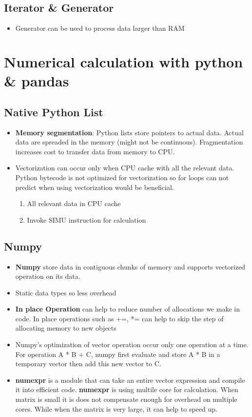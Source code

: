 \documentclass{article}
\begin{document}
	\subsection{Iterator \& Generator}
		\begin{itemize}
			\item Generator can be used to process data larger than RAM
		\end{itemize}


\section{Numerical calculation with python \& pandas}
	\subsection{Native Python List}
		\begin{itemize}
			\item {\bf Memory segmentation}: Python lists store pointers to actual data. Actual data are spreaded in the memory (might not be continuous). Fragmentation increases cost to transfer data from memory to CPU.
			\item Vectorization can occur only when CPU cache with all the relevant data. Python bytecode is not optimized for vectorization so for loops can not predict when using vectorization would be beneficial.
				\begin{enumerate}
					\item All relevant data in CPU cache
					\item Invoke SIMU instruction for calculation
				\end{enumerate}
		\end{itemize}
	\subsection{Numpy}
		\begin{itemize}
			\item {\bf Numpy} store data in contiguous chunks of memory and supports vectorized operation on its data.
			\item Static data types so less overhead
			\item {\bf In place Operation} can help to reduce  number of allocations we make in code. In place operations such as +=, *= can help to skip the step of allocating memory to new objects
			\item Numpy's optimization of vector operation occur only one operation at a time. For operation A * B + C, numpy first evaluate and store A * B in a temporary vector then add this new vector to C. 
			\item {\bf numexpr} is a module that can take an entire vector expression and compile it into efficient code. {\bf numexpr} is using multile core for calculation. When matrix is small it is does not compensate enough for overhead on multiple cores. While when the matrix is very large, it can help to speed up.
		\end{itemize}
\end{document}
